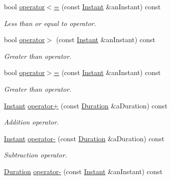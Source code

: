 \begin{DoxyCompactItemize}
bool \hyperlink{classlibrary_1_1physics_1_1time_1_1_instant_a44bc09a2eb633bbb08b240dd886402ee}{operator$<$=} (const \hyperlink{classlibrary_1_1physics_1_1time_1_1_instant}{Instant} \&an\+Instant) const
\begin{DoxyCompactList}\small\item\em Less than or equal to operator. \end{DoxyCompactList}\item 
bool \hyperlink{classlibrary_1_1physics_1_1time_1_1_instant_ad9ddedc5a5ce3d69894577dbd34bb6ce}{operator$>$} (const \hyperlink{classlibrary_1_1physics_1_1time_1_1_instant}{Instant} \&an\+Instant) const
\begin{DoxyCompactList}\small\item\em Greater than operator. \end{DoxyCompactList}\item 
bool \hyperlink{classlibrary_1_1physics_1_1time_1_1_instant_a025f5f159e2a7fb0320c3e0d55cff341}{operator$>$=} (const \hyperlink{classlibrary_1_1physics_1_1time_1_1_instant}{Instant} \&an\+Instant) const
\begin{DoxyCompactList}\small\item\em Greater than operator. \end{DoxyCompactList}\item 
\hyperlink{classlibrary_1_1physics_1_1time_1_1_instant}{Instant} \hyperlink{classlibrary_1_1physics_1_1time_1_1_instant_afa8c43afa94b882543c64e9610ccdc61}{operator+} (const \hyperlink{classlibrary_1_1physics_1_1time_1_1_duration}{Duration} \&a\+Duration) const
\begin{DoxyCompactList}\small\item\em Addition operator. \end{DoxyCompactList}\item 
\hyperlink{classlibrary_1_1physics_1_1time_1_1_instant}{Instant} \hyperlink{classlibrary_1_1physics_1_1time_1_1_instant_a7b64292c796d6c54bfab311a1e13735f}{operator-\/} (const \hyperlink{classlibrary_1_1physics_1_1time_1_1_duration}{Duration} \&a\+Duration) const
\begin{DoxyCompactList}\small\item\em Subtraction operator. \end{DoxyCompactList}\item 
\hyperlink{classlibrary_1_1physics_1_1time_1_1_duration}{Duration} \hyperlink{classlibrary_1_1physics_1_1time_1_1_instant_a913a30067f54516382a5ea6548d2a16d}{operator-\/} (const \hyperlink{classlibrary_1_1physics_1_1time_1_1_instant}{Instant} \&an\+Instant) const

\end{DoxyCompactItemize}
